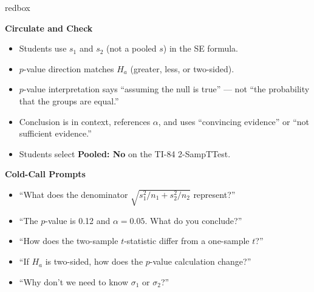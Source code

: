 \documentclass[10pt]{article}
\begin{document}
\begin{skillbox}{redbox}
\begin{minipage}[t]{0.48\linewidth}
    \textbf{Circulate and Check}
    \begin{itemize}
        \item Students use $s_1$ and $s_2$ (not a pooled $s$) in the SE formula.
        \item $p$-value direction matches $H_a$ (greater, less, or two-sided).
        \item $p$-value interpretation says ``assuming the null is true'' --- not
              ``the probability that the groups are equal.''
        \item Conclusion is in context, references $\alpha$, and uses ``convincing
              evidence'' or ``not sufficient evidence.''
        \item Students select \textbf{Pooled: No} on the TI-84 2-SampTTest.
    \end{itemize}
\end{minipage}
\hfill
\begin{minipage}[t]{0.48\linewidth}
    \textbf{Cold-Call Prompts}
    \begin{itemize}
        \item ``What does the denominator $\sqrt{s_1^2/n_1 + s_2^2/n_2}$ represent?''
        \item ``The $p$-value is 0.12 and $\alpha = 0.05$. What do you conclude?''
        \item ``How does the two-sample $t$-statistic differ from a one-sample $t$?''
        \item ``If $H_a$ is two-sided, how does the $p$-value calculation change?''
        \item ``Why don't we need to know $\sigma_1$ or $\sigma_2$?''
    \end{itemize}
\end{minipage}
\end{skillbox}
\end{document}
